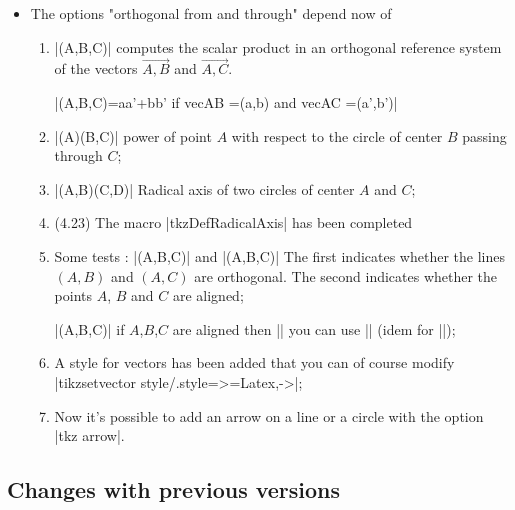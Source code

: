 \begin{itemize}
\item The options "orthogonal from and through" depend now of 

\begin{enumerate}
  
  \item |\tkzDotProduct(A,B,C)| computes the scalar product in an orthogonal reference system of the vectors $\overrightarrow{A,B}$ and $\overrightarrow{A,C}$. 
  
  |\tkzDotProduct(A,B,C)=aa'+bb' if vec{AB} =(a,b) and vec{AC} =(a',b')|
  
  
  \item |\tkzPowerCircle(A)(B,C)| power of point $A$ with respect to the circle of center $B$ passing through $C$;
  
  
  \item |\tkzDefRadicalAxis(A,B)(C,D)| Radical axis of two circles of center $A$ and $C$;


\item (4.23) The macro |tkzDefRadicalAxis| has been completed
  
  \item Some tests : |\tkzIsOrtho(A,B,C)| and |\tkzIsLinear(A,B,C)| The first indicates whether the lines $(A,B)$ and $(A,C)$ are orthogonal. The second indicates whether the points $A$, $B$ and $C$ are aligned;

 |\tkzIsLinear(A,B,C)| if $A$,$B$,$C$ are aligned then |\tkzLineartrue|
  you can use |\iftkzLinear| (idem for |\tkzIsOrtho|);

\item A style for vectors has been added that you can of course modify
|tikzset{vector style/.style={>=Latex,->}}|;


\item Now it's possible to add an arrow on a line or a circle with the option |tkz arrow|. 
\end{enumerate}
\end{itemize}

\subsection{Changes with previous versions} %
\label{sub:changes_with_previous_versions}

